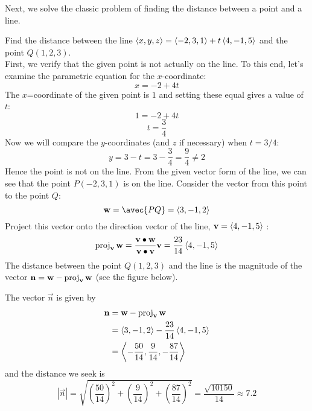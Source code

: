 \documentclass[handout]{ximera}
\begin{document}
Next, we solve the classic problem of finding the distance between a point and a line.

\begin{example}[Example 4]
Find the distance between the line $\left\langle x,y,z\right\rangle = \left\langle -2,3,1\right\rangle + t \left\langle 4,-1,5\right\rangle$ and the point $Q(1, 2, 3)$.\\
First, we verify that the given point is not actually on the line. 
To this end, let's examine the parametric equation for the $x$-coordinate:
\[
x = -2 + 4t
\]
The $x$=coordinate of the given point is $1$ and setting these equal gives a value of $t$:
\[
1 = -2 + 4t
\]
\[
t = \frac34
\]
Now we will compare the $y$-coordinates (and $z$ if necessary) when $t= 3/4$:
\[
y = 3 - t = 3 -\frac34 = \frac94 \neq 2
\]
Hence the point is not on the line.
From the given vector form of the line, we can see that the point $P(-2, 3, 1)$ is on the line.  
Consider the vector from this point to the point $Q$:
\[
\vec{w} = \avec{PQ} = \vector{3, -1, 2}
\]
Project this vector onto the direction vector of the line, $\mathbf{v} = \left\langle 4, -1, 5\right\rangle$ :
\[
\operatorname{proj}_{\mathbf{v}}\mathbf{w} = \frac{\mathbf{v} \bullet \mathbf{w}}{\mathbf{v} \bullet \mathbf{v}}\mathbf{v} = \frac{23}{14}\left\langle 4,-1,5\right\rangle
\]
The distance between the point $Q(1, 2, 3)$ and the line is the magnitude of the 
vector $\mathbf{n} = \mathbf{w} - \operatorname{proj}_{\mathbf{v}}\mathbf{w}$ (see the figure below).



\begin{image}
\end{image}

The vector $\vec{n}$ is given by
\begin{align*}
\mathbf{n} &= \mathbf{w} -  \operatorname{proj}_{\mathbf{v}} \mathbf{w}\\
&=\left\langle 3, -1, 2\right\rangle - \frac{23}{14}\left\langle 4,-1,5\right\rangle \\
&= \left\langle -\frac{50}{14},\frac{9}{14},-\frac{87}{14}\right\rangle
\end{align*}
and the distance we seek is
\[
|\vec{n}| = \sqrt{ \left(\frac{50}{14}\right)^2 +  \left(\frac{9}{14}\right)^2 + \left(\frac{87}{14}\right)^2} = \frac{\sqrt{10150}}{14}\approx 7.2
\]

\end{example}
\end{document}
